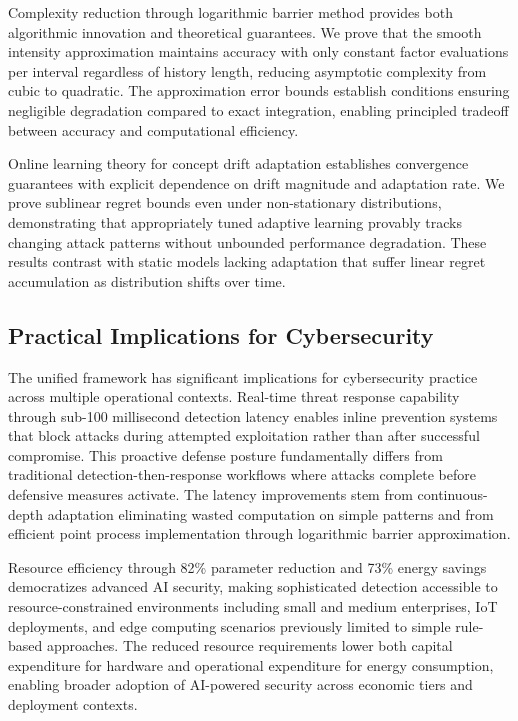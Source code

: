 \documentclass[10pt,journal,compsoc]{IEEEtran}
\begin{document}
Complexity reduction through logarithmic barrier method provides both algorithmic innovation and theoretical guarantees. We prove that the smooth intensity approximation maintains accuracy with only constant factor evaluations per interval regardless of history length, reducing asymptotic complexity from cubic to quadratic. The approximation error bounds establish conditions ensuring negligible degradation compared to exact integration, enabling principled tradeoff between accuracy and computational efficiency.

Online learning theory for concept drift adaptation establishes convergence guarantees with explicit dependence on drift magnitude and adaptation rate. We prove sublinear regret bounds even under non-stationary distributions, demonstrating that appropriately tuned adaptive learning provably tracks changing attack patterns without unbounded performance degradation. These results contrast with static models lacking adaptation that suffer linear regret accumulation as distribution shifts over time.

\subsection{Practical Implications for Cybersecurity}

The unified framework has significant implications for cybersecurity practice across multiple operational contexts. Real-time threat response capability through sub-100 millisecond detection latency enables inline prevention systems that block attacks during attempted exploitation rather than after successful compromise. This proactive defense posture fundamentally differs from traditional detection-then-response workflows where attacks complete before defensive measures activate. The latency improvements stem from continuous-depth adaptation eliminating wasted computation on simple patterns and from efficient point process implementation through logarithmic barrier approximation.

Resource efficiency through 82\% parameter reduction and 73\% energy savings democratizes advanced AI security, making sophisticated detection accessible to resource-constrained environments including small and medium enterprises, IoT deployments, and edge computing scenarios previously limited to simple rule-based approaches. The reduced resource requirements lower both capital expenditure for hardware and operational expenditure for energy consumption, enabling broader adoption of AI-powered security across economic tiers and deployment contexts.
\end{document}
